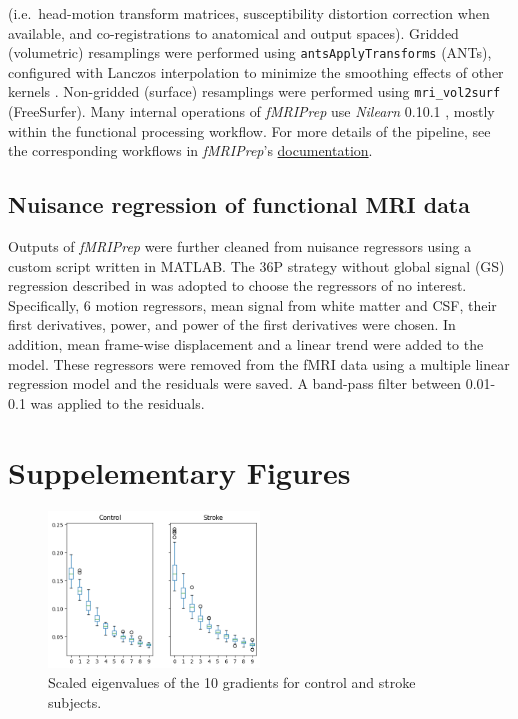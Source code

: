 \documentclass[fleqn,10pt]{wlscirep}
\begin{document}
(i.e.~head-motion transform matrices, susceptibility distortion
correction when available, and co-registrations to anatomical and output
spaces). Gridded (volumetric) resamplings were performed using
\texttt{antsApplyTransforms} (ANTs), configured with Lanczos
interpolation to minimize the smoothing effects of other kernels
\citep{lanczos}. Non-gridded (surface) resamplings were performed using
\texttt{mri\_vol2surf} (FreeSurfer). Many internal operations of \emph{fMRIPrep} use \emph{Nilearn} 0.10.1
\citep[RRID:SCR\_001362]{abraham2014machine}, mostly within the functional
processing workflow. For more details of the pipeline, see the
corresponding workflows in \emph{fMRIPrep}'s \href{https://fmriprep.readthedocs.io/en/latest/workflows.html}{documentation}.


\subsection*{Nuisance regression of functional MRI data}
Outputs of \emph{fMRIPrep} were further cleaned from nuisance regressors using a custom script written in MATLAB. The 36P strategy without global signal (GS) regression described in \citet{satterthwaite_2013} was adopted to choose the regressors of no interest. Specifically, 6 motion regressors, mean signal from white matter and CSF, their first derivatives, power, and power of the first derivatives were chosen. In addition, mean frame-wise displacement and a linear trend were added to the model. These regressors were removed from the fMRI data using a multiple linear regression model and the residuals were saved. A band-pass filter between 0.01-0.1 was applied to the residuals. 

\color{black}

\clearpage
\section*{Suppelementary Figures}
\begin{figure}[h!]
\centering
\includegraphics[width=0.5\textwidth]{figures/supp_fig1.png}
\renewcommand{\figurename}{Supplementary Figure}
\caption{\label{fig:lambdas} Scaled eigenvalues of the 10 gradients for control and stroke subjects.  } 
\end{figure}
\end{document}

